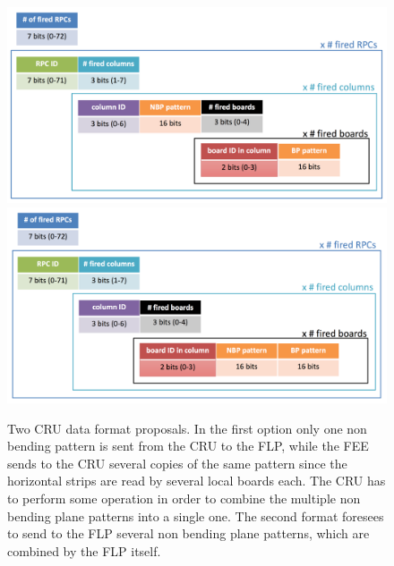 \begin{figure}[!ht]
\begin{center}
\includegraphics[width=0.99\linewidth]{Chapters/O2/Figs/MID_format_2.pdf}
\includegraphics[width=0.99\linewidth]{Chapters/O2/Figs/MID_format_1.pdf}
\caption{Two CRU data format proposals. 
In the first option only one non bending pattern is sent from the CRU to the FLP, while the FEE sends to the CRU several copies of the same pattern since the horizontal strips are read by several local boards each. The CRU has to perform some operation in order to combine the multiple non bending plane patterns into a single one.
The second format foresees to send to the FLP several non bending plane patterns, which are combined by the FLP itself.}
\label{fig:MID_CRU_DF}
\end{center}
\end{figure}


